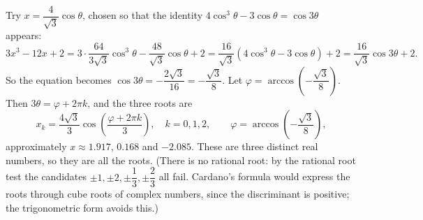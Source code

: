 Try $x=\dfrac{4}{\sqrt3}\cos\theta$, chosen so that the identity $4\cos^3\theta-3\cos\theta=\cos3\theta$ appears:
\[
3x^3-12x+2=3\cdot\dfrac{64}{3\sqrt3}\cos^3\theta-\dfrac{48}{\sqrt3}\cos\theta+2=\dfrac{16}{\sqrt3}\left(4\cos^3\theta-3\cos\theta\right)+2=\dfrac{16}{\sqrt3}\cos3\theta+2 .
\]
So the equation becomes $\cos3\theta=-\dfrac{2\sqrt3}{16}=-\dfrac{\sqrt3}{8}$. Let $\varphi=\arccos\left(-\dfrac{\sqrt3}{8}\right)$. Then $3\theta=\varphi+2\pi k$, and the three roots are
\[
\boxed{x_k=\dfrac{4\sqrt3}{3}\cos\left(\dfrac{\varphi+2\pi k}{3}\right),\quad k=0,1,2,\qquad \varphi=\arccos\left(-\dfrac{\sqrt3}{8}\right)},
\]
approximately $x\approx1.917$, $0.168$ and $-2.085$. These are three distinct real numbers, so they are all the roots. (There is no rational root: by the rational root test the candidates $\pm1,\pm2,\pm\dfrac{1}{3},\pm\dfrac{2}{3}$ all fail. Cardano's formula would express the roots through cube roots of complex numbers, since the discriminant is positive; the trigonometric form avoids this.)
